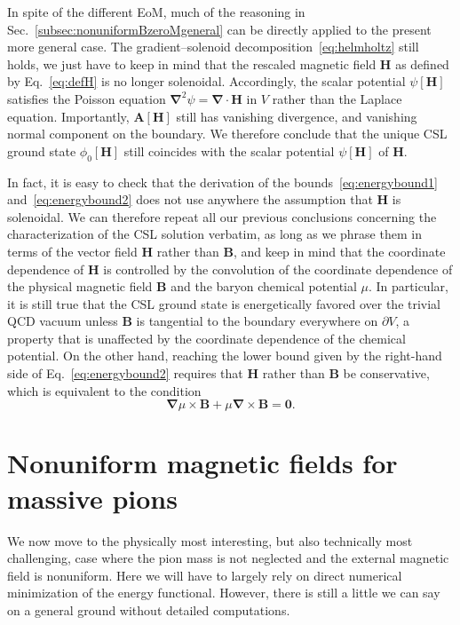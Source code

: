 \documentclass[pdflatex,iicol,sn-mathphys-num]{sn-jnl}
\let\m=\mu
\let\p=\phi
\let\de=\partial
\newcommand{\vek}[1]{\bm{#1}}%
\newcommand{\grad}{\vek\nabla}%
\newcommand{\divg}{\grad\cdot}%
\begin{document}
In spite of the different EoM, much of the reasoning in Sec.~\ref{subsec:nonuniformBzeroMgeneral} can be directly applied to the present more general case. The gradient--solenoid decomposition~\eqref{eq:helmholtz} still holds, we just have to keep in mind that the rescaled magnetic field $\vek H$ as defined by Eq.~\eqref{eq:defH} is no longer solenoidal. Accordingly, the scalar potential $\psi[\vek H]$ satisfies the Poisson equation $\grad^2\psi=\divg\vek H$ in $V$ rather than the Laplace equation. Importantly, $\vek A[\vek H]$ still has vanishing divergence, and vanishing normal component on the boundary. We therefore conclude that the unique CSL ground state $\p_0[\vek H]$  still coincides with the scalar potential $\psi[\vek H]$ of $\vek H$.

In fact, it is easy to check that the derivation of the bounds~\eqref{eq:energybound1} and~\eqref{eq:energybound2} does not use anywhere the assumption that $\vek H$ is solenoidal. We can therefore repeat all our previous conclusions concerning the characterization of the CSL solution verbatim, as long as we phrase them in terms of the vector field $\vek H$ rather than $\vek B$, and keep in mind that the coordinate dependence of $\vek H$ is controlled by the convolution of the coordinate dependence of the physical magnetic field $\vek B$ and the baryon chemical potential $\m$. In particular, it is still true that the CSL ground state is energetically favored over the trivial QCD vacuum unless $\vek B$ is tangential to the boundary everywhere on $\de V$, a property that is unaffected by the coordinate dependence of the chemical potential. On the other hand, reaching the lower bound given by the right-hand side of Eq.~\eqref{eq:energybound2} requires that $\vek H$ rather than $\vek B$ be conservative, which is equivalent to the condition
\begin{equation}
\grad\m\times\vek B+\m\grad\times\vek B=\vek0.
\end{equation}


\section{Nonuniform magnetic fields for massive pions}
\label{sec:nonuniformBnonzeroM}

We now move to the physically most interesting, but also technically most challenging, case where the pion mass is not neglected and the external magnetic field is nonuniform. Here we will have to largely rely on direct numerical minimization of the energy functional. However, there is still a little we can say on a general ground without detailed computations.
\end{document}
